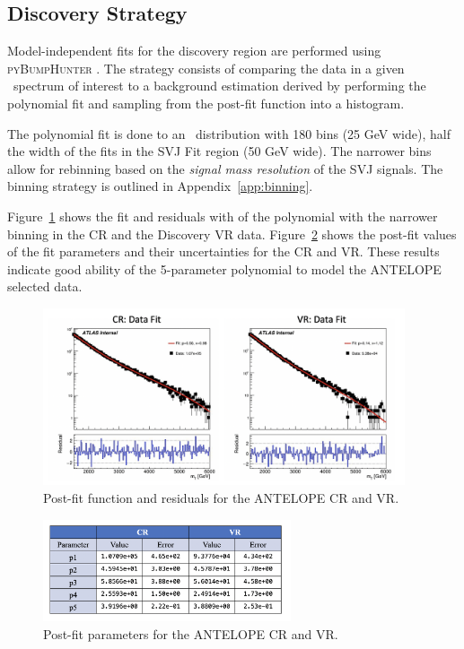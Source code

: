 \subsection{Discovery Strategy}
\label{subsec:fit_bh}

Model-independent fits for the discovery region are performed using \textsc{pyBumpHunter} \cite{bumphunt}.
The strategy consists of comparing the data in a given \mt~spectrum of interest to a background estimation derived by performing the polynomial fit and sampling from the post-fit function into a histogram.

The polynomial fit is done to an \mt~distribution with 180 bins (25 GeV wide), half the width of the fits in the SVJ Fit region (50 GeV wide). %
The narrower bins allow for rebinning based on the \textit{signal mass resolution} of the SVJ signals.
The binning strategy is outlined in Appendix~\ref{app:binning}.

Figure~\ref{fig:bkgfit_data_crvr_antelope} shows the fit and residuals with of the polynomial with the narrower binning in the CR and the Discovery VR data.
Figure~\ref{fig:postfit_param_antelope} shows the post-fit values of the fit parameters and their uncertainties for the CR and VR. 
These results indicate good ability of the 5-parameter polynomial to model the ANTELOPE selected data.

\begin{figure}[!htbp]
\centering
   \includegraphics[width=0.95\textwidth]{figures/stats/bkgfit_data_crvr_antelope}
    \caption{Post-fit function and residuals for the ANTELOPE CR and VR.
    \label{fig:bkgfit_data_crvr_antelope}}
\end{figure}

\begin{figure}[!htbp]
\centering
   \includegraphics[width=0.65\textwidth]{figures/stats/postfit_param_antelope}
    \caption{Post-fit parameters for the ANTELOPE CR and VR.
    \label{fig:postfit_param_antelope}}
\end{figure}

